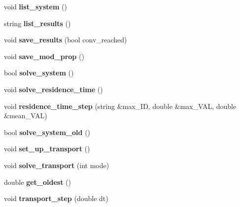 \begin{DoxyCompactItemize}
\item 
\hypertarget{class_staci_ae95917401c8454a747a24880faa20138}{}\label{class_staci_ae95917401c8454a747a24880faa20138} 
void {\bfseries list\+\_\+system} ()
\item 
\hypertarget{class_staci_a54bf8a354a57dbafda0bf775c66d6524}{}\label{class_staci_a54bf8a354a57dbafda0bf775c66d6524} 
string {\bfseries list\+\_\+results} ()
\item 
\hypertarget{class_staci_a0cf78089da2693f039b4fe5e2b5c21d2}{}\label{class_staci_a0cf78089da2693f039b4fe5e2b5c21d2} 
void {\bfseries save\+\_\+results} (bool conv\+\_\+reached)
\item 
\hypertarget{class_staci_acd4cd93f1e82bc555915122bd77e3b67}{}\label{class_staci_acd4cd93f1e82bc555915122bd77e3b67} 
void {\bfseries save\+\_\+mod\+\_\+prop} ()
\item 
\hypertarget{class_staci_a86917fe19f9c274dac7fbf5fd86e44ba}{}\label{class_staci_a86917fe19f9c274dac7fbf5fd86e44ba} 
bool {\bfseries solve\+\_\+system} ()
\item 
\hypertarget{class_staci_a884616aaebef6a088c562e56c0f68525}{}\label{class_staci_a884616aaebef6a088c562e56c0f68525} 
void {\bfseries solve\+\_\+residence\+\_\+time} ()
\item 
\hypertarget{class_staci_a403aabb120769ddc037a69548b2c2134}{}\label{class_staci_a403aabb120769ddc037a69548b2c2134} 
void {\bfseries residence\+\_\+time\+\_\+step} (string \&max\+\_\+\+ID, double \&max\+\_\+\+V\+AL, double \&mean\+\_\+\+V\+AL)
\item 
\hypertarget{class_staci_ad9b04218bcc23ddc5b6e1d247f5ffb8f}{}\label{class_staci_ad9b04218bcc23ddc5b6e1d247f5ffb8f} 
bool {\bfseries solve\+\_\+system\+\_\+old} ()
\item 
\hypertarget{class_staci_ac71d40c423576c540b594c7e3a7f1365}{}\label{class_staci_ac71d40c423576c540b594c7e3a7f1365} 
void {\bfseries set\+\_\+up\+\_\+transport} ()
\item 
\hypertarget{class_staci_a8ac839cd977519ad3a6a6a5ba85f4d35}{}\label{class_staci_a8ac839cd977519ad3a6a6a5ba85f4d35} 
void {\bfseries solve\+\_\+transport} (int mode)
\item 
\hypertarget{class_staci_a7dde80c0f00d33639f459fca9d7b1314}{}\label{class_staci_a7dde80c0f00d33639f459fca9d7b1314} 
double {\bfseries get\+\_\+oldest} ()
\item 
\hypertarget{class_staci_a82c116ba2e4338362e1efa7410acba07}{}\label{class_staci_a82c116ba2e4338362e1efa7410acba07} 
void {\bfseries transport\+\_\+step} (double dt)
\item 

\end{DoxyCompactItemize}
